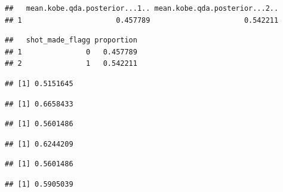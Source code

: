 \documentclass[]{article}
\begin{document}
\begin{verbatim}
##   mean.kobe.qda.posterior...1.. mean.kobe.qda.posterior...2..
## 1                      0.457789                      0.542211
\end{verbatim}

\begin{verbatim}
##   shot_made_flagg proportion
## 1               0   0.457789
## 2               1   0.542211
\end{verbatim}

\begin{verbatim}
## [1] 0.5151645
\end{verbatim}

\begin{verbatim}
## [1] 0.6658433
\end{verbatim}

\begin{verbatim}
## [1] 0.5601486
\end{verbatim}

\begin{verbatim}
## [1] 0.6244209
\end{verbatim}

\begin{verbatim}
## [1] 0.5601486
\end{verbatim}

\begin{verbatim}
## [1] 0.5905039
\end{verbatim}
\end{document}
